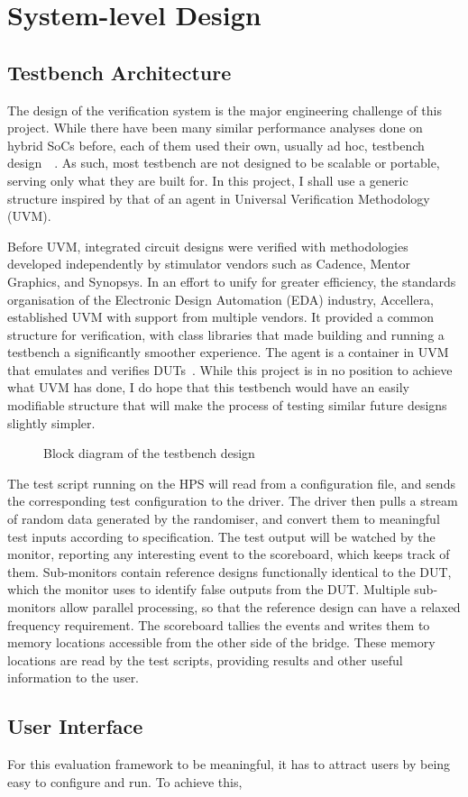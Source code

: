 \section{System-level Design}

\subsection{Testbench Architecture}
The design of the verification system is the major engineering challenge of this project.
While there have been many similar performance analyses done on hybrid SoCs before, each of them used their own, usually ad hoc, testbench design~\cite{Shi1}~\cite{Li1}.
As such, most testbench are not designed to be scalable or portable, serving only what they are built for.
In this project, I shall use a generic structure inspired by that of an agent in Universal Verification Methodology (UVM).

Before UVM, integrated circuit designs were verified with methodologies developed independently by stimulator vendors such as Cadence, Mentor Graphics, and Synopsys.
In an effort to unify for greater efficiency, the standards organisation of the Electronic Design Automation (EDA) industry, Accellera, established UVM with support from multiple vendors.
It provided a common structure for verification, with class libraries that made building and running a testbench a significantly smoother experience.
The agent is a container in UVM that emulates and verifies DUTs~\cite{Accellera1}.
While this project is in no position to achieve what UVM has done, I do hope that this testbench would have an easily modifiable structure that will make the process of testing similar future designs slightly simpler.

\begin{figure}[H]
  \centering
  
  \caption{Block diagram of the testbench design}
  \label{Block}
\end{figure}

The test script running on the HPS will read from a configuration file, and sends the corresponding test configuration to the driver.
The driver then pulls a stream of random data generated by the randomiser, and convert them to meaningful test inputs according to specification.
The test output will be watched by the monitor, reporting any interesting event to the scoreboard, which keeps track of them.
Sub-monitors contain reference designs functionally identical to the DUT, which the monitor uses to identify false outputs from the DUT.
Multiple sub-monitors allow parallel processing, so that the reference design can have a relaxed frequency requirement.
The scoreboard tallies the events and writes them to memory locations accessible from the other side of the bridge.
These memory locations are read by the test scripts, providing results and other useful information to the user.

\subsection{User Interface}

For this evaluation framework to be meaningful, it has to attract users by being easy to configure and run.
To achieve this, 
